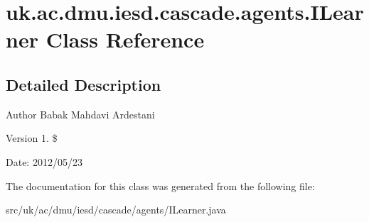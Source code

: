 \hypertarget{classuk_1_1ac_1_1dmu_1_1iesd_1_1cascade_1_1agents_1_1_i_learner}{\section{uk.\-ac.\-dmu.\-iesd.\-cascade.\-agents.\-I\-Learner Class Reference}
\label{classuk_1_1ac_1_1dmu_1_1iesd_1_1cascade_1_1agents_1_1_i_learner}
}


\subsection{Detailed Description}
\begin{DoxyAuthor}{Author}
Babak Mahdavi Ardestani 
\end{DoxyAuthor}
\begin{DoxyVersion}{Version}
1. \$ 
\end{DoxyVersion}
\begin{DoxyParagraph}{Date\-:}
2012/05/23 
\end{DoxyParagraph}


The documentation for this class was generated from the following file\-:\begin{DoxyCompactItemize}
\item 
src/uk/ac/dmu/iesd/cascade/agents/I\-Learner.\-java\end{DoxyCompactItemize}
